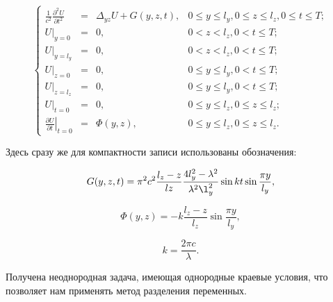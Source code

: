 \begin{equation}
\label{eq:new_problem}
\left\{
\begin{array}{rclr}
\frac{1}{c^2} \frac{\partial^2 U}{\partial t^2} & = & \Delta_{yz} U + G(y, z, t), & 0 \le y \le l_y, 0 \le z \le l_z, 0 \le t \le T; \\
\left. U \right|_{y=0} & = & 0, & 0 < z < l_z, 0 < t \le T; \\
\left. U \right|_{y=l_y} & = & 0, & 0 < z < l_z, 0 < t \le T; \\ 
\left. U \right|_{z=0} & = &  0, & 0 \le y \le l_y, 0 < t \le T; \\
\left. U \right|_{z=l_z} &=& 0, & 0 \le y \le l_y, 0 < t \le T; \\
\left. U \right|_{t=0} & = & 0, & 0 \le y \le l_z, 0 \le z \le l_z; \\
\left. \frac{\partial U}{\partial t} \right|_{t=0} &=& \Phi(y, z), & 0 \le y \le l_z, 0 \le z \le l_z.
\end{array}
\right.
\end{equation}

Здесь сразу же для компактности записи использованы обозначения:

\begin{equation}
\label{eq:g}
G(y, z, t) = \pi^2 c^2\frac{l_z - z}{lz}\frac{4l_y^2 - \lambda^2}{\lambda^2 \l_y^2}\sin k t \sin\frac{\pi y}{l_y},
\end{equation}

\begin{equation}
\label{eq:phi}
\Phi(y, z) = -k\frac{l_z - z}{l_z}\sin\frac{\pi y}{l_y},
\end{equation}

\begin{equation}
\label{eq:k}
k = \frac{2 \pi c}{\lambda}.
\end{equation}


Получена неоднородная задача, имеющая однородные краевые условия, что
позволяет нам применять метод разделения переменных.
